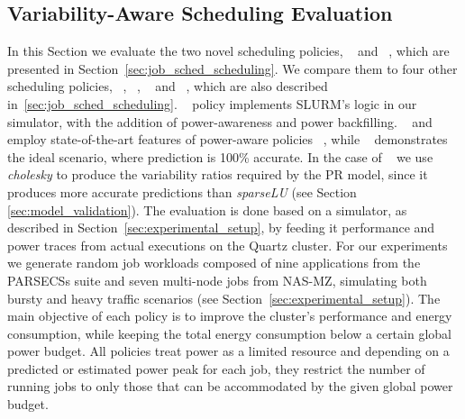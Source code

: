 \subsection{Variability-Aware Scheduling Evaluation}
\label{sec:var_sched_eval}

In this Section we evaluate the two novel scheduling policies, \PRVSSched~ and
\PMCVSSched~, which are presented in Section~\ref{sec:job_sched_scheduling}.  We compare them to
four other scheduling policies, \DefaultSched~, \PESched~, \PEVASched~ and \IVSSched~,
which are also described in~\ref{sec:job_sched_scheduling}.  \DefaultSched~ policy implements
SLURM's logic in our simulator, with the addition of power-awareness and power
backfilling.  \PESched~ and \PEVASched~ employ state-of-the-art features of power-aware
policies ~\cite{patki:2013:eho:2464996.2465009,7515666,Gholkar:2016:PTH:2967938.2967961},
while \IVSSched~ demonstrates the ideal scenario, where prediction is 100\% accurate.  In
the case of \PRVSSched~ we use \textit{cholesky} to produce the variability ratios
required by the PR model, since it produces more accurate predictions than
\textit{sparseLU} (see Section \ref{sec:model_validation}).  The evaluation is done based
on a simulator, as described in Section~\ref{sec:experimental_setup}, by feeding it
performance and power traces from actual executions on the Quartz cluster.  For our
experiments we generate random job workloads composed of nine applications from the
PARSECSs suite and seven multi-node jobs from NAS-MZ, simulating both bursty and heavy
traffic scenarios (see Section~\ref{sec:experimental_setup}).  The main objective of each
policy is to improve the cluster's performance and energy consumption, while keeping the
total energy consumption below a certain global power budget.  All policies treat power as
a limited resource and depending on a predicted or estimated power peak for each job, they
restrict the number of running jobs to only those that can be accommodated by the given
global power budget.  

